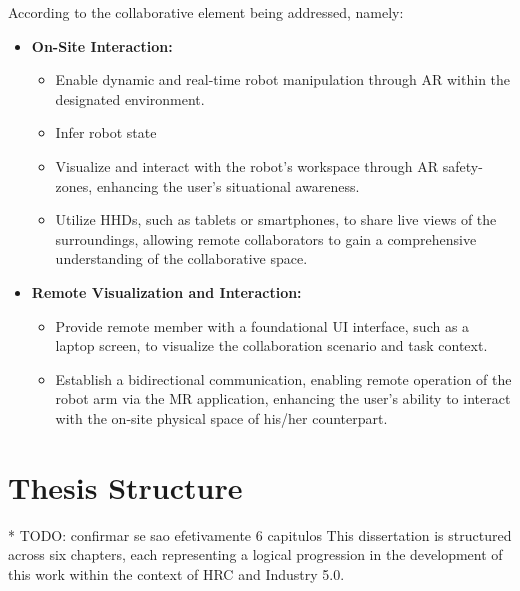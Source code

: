 According to the collaborative element being addressed, namely: 
\begin{itemize}
    \item \textbf{On-Site Interaction:}
    \begin{itemize}
        \item Enable dynamic and real-time robot manipulation through \ac{AR} within the designated environment.
        \item Infer robot state
        \item Visualize and interact with the robot's workspace through \ac{AR} safety-zones, enhancing the user's situational awareness.
        \item Utilize \ac{HHDs}, such as tablets or smartphones, to share live views of the surroundings, allowing remote collaborators 
        to gain a comprehensive understanding of the collaborative space.
    \end{itemize}
    \item \textbf{Remote Visualization and Interaction:}
    \begin{itemize}
        \item Provide remote member with a foundational \ac{UI} interface, such as a laptop screen, to visualize the collaboration scenario and 
        task context.
        \item Establish a bidirectional communication, enabling remote operation of the robot arm via the \ac{MR} application, enhancing the user's ability to interact with the on-site physical space of his/her counterpart.
    \end{itemize}
\end{itemize}


\section{Thesis Structure}
% 
* TODO: confirmar se sao efetivamente 6 capitulos 
This dissertation is structured across six chapters, each representing a logical progression in the development of this work within the context of \ac{HRC} and Industry 5.0.

